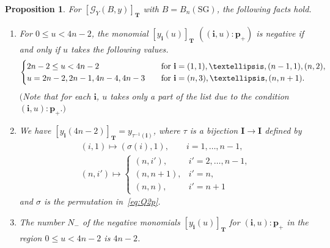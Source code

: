 \documentclass[11pt]{article}
\numberwithin{equation}{section}
\newtheorem{Proposition}[Theorem]{Proposition}
\theoremstyle{definition}
\begin{document}
\begin{Proposition}
\label{prop:lev2}
 For
$[\mathcal{G}_Y(B,y)]_{\mathbf{T}}$
with $B=B_{n}(\mathrm{SG})$, the following facts hold.

\begin{enumerate}\itemsep=0pt
\item[$(i)$]  For $0 \le u < 4n-2$,
the  monomial $[y_{\mathbf{i}}(u)]_{\mathbf{T}}$
$((\mathbf{i},u):\mathbf{p}_+)$
is negative if and only if $u$ takes the following values.
\[
\begin{cases}
2n-2 \leq u < 4n-2 &
\quad\mbox{\rm for $\mathbf{i}=(1,1),\dots,(n-1,1),(n,2)$},\\
u=2n-2,2n-1, 4n-4, 4n-3 &
\quad\mbox{\rm for $\mathbf{i}=(n,3),\dots,(n,n+1)$}.
\end{cases}
\]
$($Note that for each $\mathbf{i}$, $u$ takes only a part
of the list due to the condition $(\mathbf{i},u):\mathbf{p}_+.)$
\item[$(ii)$]
 We have $[y_{\mathbf{i}}(4n-2)]_{\mathbf{T}}
=y_{\tau^{-1}(\mathbf{i})}$,
where $\tau$ is a bijection $\mathbf{I} \rightarrow
\mathbf{I}$ defined by
\begin{gather*}
(i,1)   \mapsto (\sigma(i),1),
\qquad i=1,\dots,n-1,\\
(n,i')   \mapsto
\begin{cases}
(n,i'),& i'=2,\dots,n-1,\\
(n,n+1),& i'=n,\\
(n,n),& i'=n+1
\end{cases}
\end{gather*}
and $\sigma$ is the permutation in~\eqref{eq:Q2p}.

\item[$(iii)$] The number $N_-$ of the negative monomials
$[y_{\mathbf{i}}(u)]_{\mathbf{T}}$ for $(\mathbf{i},u):\mathbf{p}_+$
in the region $0\leq u < 4n-2$ is $4n-2$.
\end{enumerate}
\end{Proposition}
\end{document}
